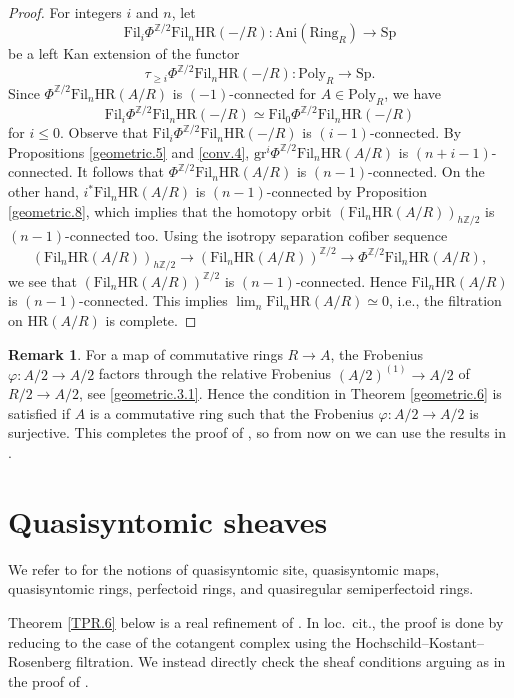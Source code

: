 \documentclass[10pt]{amsart}
\theoremstyle{definition}
\newtheorem{rmk}[thm]{Remark}
\numberwithin{equation}{section}
\newcommand{\Z}{\mathbb{Z}}
\newcommand{\Ani}{\mathrm{Ani}}
\newcommand{\Ring}{\mathrm{Ring}}
\newcommand{\Sp}{\mathrm{Sp}}
\newcommand{\Poly}{\mathrm{Poly}}
\newcommand{\gr}{\mathrm{gr}}
\newcommand{\Fil}{\mathrm{Fil}}
\newcommand{\HR}{\mathrm{HR}}
\begin{document}
{\begin{proof}
For integers $i$ and $n$,
let
\[
\Fil_i \Phi^{\Z/2}\Fil_n \HR(-/R)
\colon
\Ani(\Ring_R)
\to
\Sp
\]
be a left Kan extension of the functor
\[
\tau_{\geq i}\Phi^{\Z/2}\Fil_n \HR(-/R)
\colon
\Poly_R
\to
\Sp.
\]
Since $\Phi^{\Z/2}\Fil_n\HR(A/R)$ is $(-1)$-connected for $A\in \Poly_R$,
we have
\[
\Fil_i \Phi^{\Z/2}\Fil_n\HR(-/R)\simeq \Fil_0 \Phi^{\Z/2}\Fil_n\HR(-/R)
\]
for $i\leq 0$.
Observe that $\Fil_i\Phi^{\Z/2}\Fil_n \HR(-/R)$ is $(i-1)$-connected.
By Propositions \ref{geometric.5} and \ref{conv.4},
$\gr^i \Phi^{\Z/2}\Fil_n \HR(A/R)$ is $(n+i-1)$-connected.
It follows that $\Phi^{\Z/2}\Fil_n \HR(A/R)$ is $(n-1)$-connected.
On the other hand,
$i^*\Fil_n \HR(A/R)$ is $(n-1)$-connected by Proposition \ref{geometric.8},
which implies that the homotopy orbit $(\Fil_n \HR(A/R))_{h\Z/2}$ is $(n-1)$-connected too.
Using the isotropy separation cofiber sequence
\[
(\Fil_n \HR(A/R))_{h\Z/2}
\to
(\Fil_n \HR(A/R))^{\Z/2}
\to
\Phi^{\Z/2}\Fil_n \HR(A/R),
\]
we see that $(\Fil_n \HR(A/R))^{\Z/2}$ is $(n-1)$-connected.
Hence $\Fil_n \HR(A/R)$ is $(n-1)$-connected.
This implies $\lim_n \Fil_n \HR(A/R)\simeq 0$,
i.e.,
the filtration on $\HR(A/R)$ is complete.
\end{proof}

\begin{rmk}
For a map of commutative rings $R\to A$,
the Frobenius $\varphi\colon A/2\to A/2$ factors through the relative Frobenius $(A/2)^{(1)}\to A/2$ of $R/2\to A/2$,
see \eqref{geometric.3.1}.
Hence the condition in Theorem \ref{geometric.6} is satisfied if $A$ is a commutative ring such that the Frobenius $\varphi\colon A/2\to A/2$ is surjective.
This completes the proof of \cite[Theorem 4.41]{HP},
so from now on we can use the results in \cite[\S 5]{HP}.
\end{rmk}





\section{Quasisyntomic sheaves}



We refer to \cite[\S 4]{BMS19} for the notions of quasisyntomic site, quasisyntomic maps, quasisyntomic rings, perfectoid rings, and quasiregular semiperfectoid rings.

Theorem \ref{TPR.6} below is a real refinement of \cite[Corollary 3.4]{BMS19}.
In loc.\ cit., the proof is done by reducing to the case of the cotangent complex using the Hochschild--Kostant--Rosenberg filtration.
We instead directly check the sheaf conditions arguing as in the proof of \cite[Theorem 3.1]{BMS19}.




}
\end{document}
